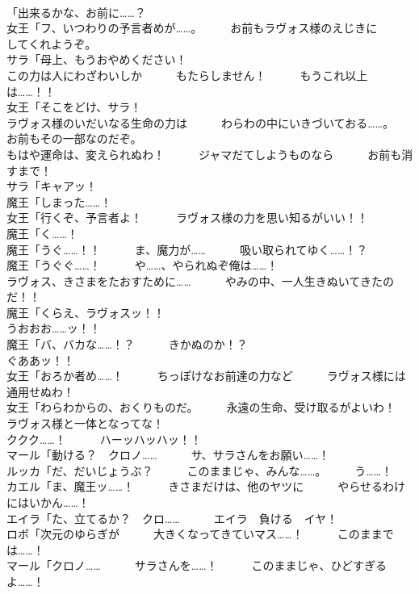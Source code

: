 \documentclass[8pt]{extreport}
\begin{document}
\begin{CJK}{UTF8}{min}
\\	「出来るかな、お前に……？	
\\	女王「フ、いつわりの予言者めが……。　　　お前もラヴォス様のえじきに　　　してくれようぞ。	
\\	サラ「母上、もうおやめください！	
\\	この力は人にわざわいしか　　　もたらしません！　　　もうこれ以上は……！！	
\\	女王「そこをどけ、サラ！	
\\	ラヴォス様のいだいなる生命の力は　　　わらわの中にいきづいておる……。　　　お前もその一部なのだぞ。	
\\	もはや運命は、変えられぬわ！　　　ジャマだてしようものなら　　　お前も消すまで！	
\\	サラ「キャアッ！	
\\	魔王「しまった……！	
\\	女王「行くぞ、予言者よ！　　　ラヴォス様の力を思い知るがいい！！	
\\	魔王「く……！	
\\	魔王「うぐ……！！　　　ま、魔力が……　　　吸い取られてゆく……！？	
\\	魔王「うぐぐ……！　　　や……、やられぬぞ俺は……！	
\\	ラヴォス、きさまをたおすために……　　　やみの中、一人生きぬいてきたのだ！！	
\\	魔王「くらえ、ラヴォスッ！！	
\\	うおおお……ッ！！	
\\	魔王「バ、バカな……！？　　　きかぬのか！？	
\\	ぐああッ！！	
\\	女王「おろか者め……！　　　ちっぽけなお前達の力など　　　ラヴォス様には通用せぬわ！	
\\	女王「わらわからの、おくりものだ。　　　永遠の生命、受け取るがよいわ！　　　ラヴォス様と一体となってな！	
\\	ククク……！　　　ハーッハッハッ！！	
\\	マール「動ける？　クロノ……　　　サ、サラさんをお願い……！	
\\	ルッカ「だ、だいじょうぶ？　　　このままじゃ、みんな……。　　　う……！	
\\	カエル「ま、魔王ッ……！　　　きさまだけは、他のヤツに　　　やらせるわけにはいかん……！	
\\	エイラ「た、立てるか？　クロ……　　　エイラ　負ける　イヤ！	
\\	ロボ「次元のゆらぎが　　　大きくなってきていマス……！　　　このままでは……！	
\\	マール「クロノ……　　　サラさんを……！　　　このままじゃ、ひどすぎるよ……！	

\end{CJK}
\end{document}
